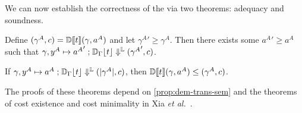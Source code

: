 We can now establish the correctness of the \transDname{} via two theorems:
adequacy and soundness.
\begin{theorem}
  Define \( (\gamma^A, c) = \mathbb{D}\llbracket t\rrbracket({\gamma}, {a^A}) \) and let
  \( {\gamma^A}' \ge \gamma^A \). Then there exists some \( {a^A}' \ge a^A \)
  such that
  \( {{\gamma, y^A \mapsto {a^A}'} \mathrel{;} {\mathbb{D}_{\Gamma}\lfloor t\rfloor}} \Downarrow^{\mathbb{L}} {({\gamma^A}', c)} \).
\end{theorem}
\begin{theorem}
  If
  \( {{\gamma, y^A \mapsto a^A} \mathrel{;} {\mathbb{D}_{\Gamma}\lfloor t\rfloor}} \Downarrow^{\mathbb{L}} {(\lvert\gamma^A\rvert, c)} \),
  then \( \mathbb{D}\llbracket t\rrbracket({\gamma}, {a^A}) \le (\gamma^A, c) \).
\end{theorem}
The proofs of these theorems depend on \cref{prop:dem-trans-sem} and the
theorems of cost existence and cost minimality in Xia \textit{et
  al.}~\cite{demand-semantics}.
